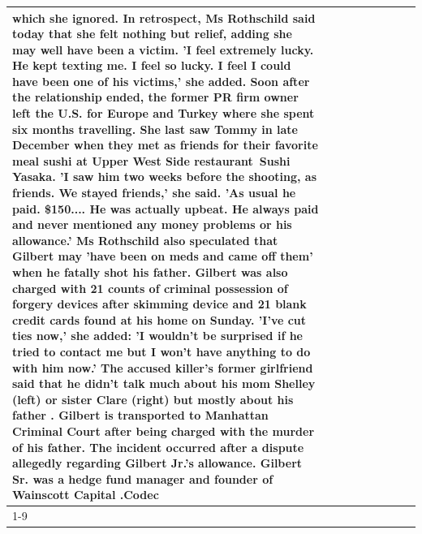 \begin{table}[H]
\begin{tabular}{lllrlllll}
which she ignored. In retrospect, Ms Rothschild said today that she felt nothing but relief, adding she may well have been a victim. 'I feel extremely lucky. He kept texting me. I feel so lucky. I feel I could have been one of his victims,' she added. Soon after the relationship ended, the former PR firm owner left the U.S. for Europe and Turkey where she spent six months  travelling. She last saw Tommy in late December when they met as friends for their favorite meal sushi at Upper West Side restaurant Sushi Yasaka. 'I saw him two weeks before the shooting, as friends. We stayed friends,' she said. 'As usual he paid. \$150.... He was actually upbeat. He always paid and never mentioned any money problems or his allowance.' Ms Rothschild also speculated that Gilbert may 'have been on meds and came off them' when he fatally shot his father. Gilbert was also charged with 21 counts of criminal possession of forgery devices after skimming device and 21 blank credit cards found at his home on Sunday. 'I've cut ties now,' she added: 'I wouldn’t be surprised if he tried to contact me but I won’t have anything to do with him now.' The accused killer's former girlfriend said that he didn't talk much about his mom Shelley (left) or sister Clare (right) but mostly about his father . Gilbert is transported to Manhattan Criminal Court  after being charged with the murder of his father. The incident occurred after a dispute allegedly regarding Gilbert Jr.'s allowance. Gilbert Sr. was a hedge fund manager and founder of Wainscott Capital .Codec \\
\cline{1-9}

\end{tabular}
\end{table}
